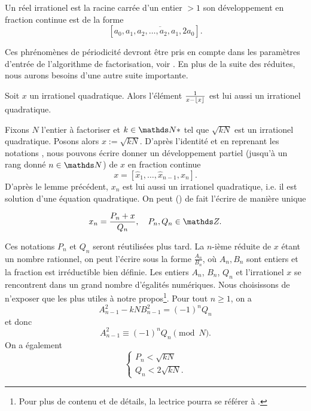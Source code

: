 \begin{theoreme}[Legendre, 1798]
	Un réel irrationel est la racine carrée d'un entier $>1$ \ssi son
	développement en fraction continue est de la forme \[[a_0, \overline{a_1,
	a_2, \dots, a_2, a_1, 2a_0}].\]
\end{theoreme}

Ces phrénomènes de périodicité devront être pris en compte dans les paramètres
d'entrée de l'algorithme de factorisation, voir . En plus de la suite
des réduites, nous aurons besoins d'une autre suite importante.

\begin{lemme}
	Soit $x$ un irrationel quadratique. Alors l'élément $\frac{1}{x - \lfloor x\rfloor}$
	est lui aussi un irrationel quadratique. 
\end{lemme}

Fixons $N$ l'entier à factoriser et $k\in \N*$ tel que $\sqrt{kN}$ est un
irrationel quadratique. Posons alors $x := \sqrt{kN}$. D'après l'identité
\label{egalite-reduite} et en reprenant les notations \label{notations}, nous
pouvons écrire donner un développement partiel (jusqu'à un rang donné $n\in
\N$) de $x$ en fraction continue \[x = [\hat{x}_1, \dots, \hat{x}_{n-1},
x_n].\] D'après le lemme précédent, $x_n$ est lui aussi un irrationel
quadratique, i.e. il est solution d'une équation quadratique. On peut
() de fait l'écrire de manière unique 

\begin{equation}
	x_n = \frac{P_n + x}{Q_n}, \quad P_n, Q_n \in \Z.
\end{equation}

Ces notations $P_n$ et $Q_n$ seront réutilisées plus tard. La $n$-ième réduite
de $x$ étant un nombre rationnel, on peut l'écrire sous la forme
$\frac{A_n}{B_n}$, où $A_n, B_n$ sont entiers et la fraction est irréductible
bien définie. Les entiers $A_n$, $B_n$, $Q_n$ et l'irrationel $x$ se
rencontrent dans un grand nombre d'égalités numériques. Nous choisissons de
n'exposer que les plus utiles à notre propos\footnote{Pour plus de contenu et
de détails, la lectrice pourra se référer à .}. Pour tout $n\geqslant
1$, on a \[A_{n-1}^2 - kN B_{n-1}^2 = (-1)^n Q_n\] et donc
\begin{equation}
	A_{n-1}^2 \equiv (-1)^n Q_n \pmod{N}.
\end{equation}
On a également
\begin{equation}
	\begin{cases}
		P_n < \sqrt{kN} \\
		Q_n < 2\sqrt{kN}.
	\end{cases}
\end{equation}

